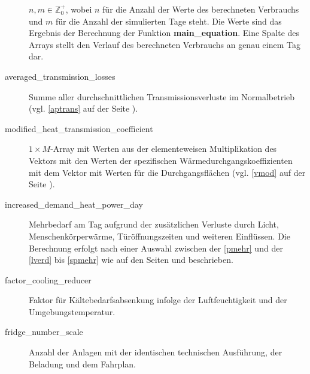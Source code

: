 \begin{description}
	$n,m\in \mathbb{Z}^+_0$, wobei $n$ f\"ur die Anzahl der Werte des
	berechneten Verbrauchs und $m$ f\"ur die Anzahl der simulierten Tage
	steht. Die Werte sind das Ergebnis der Berechnung der Funktion
	\textbf{main\_equation}. Eine Spalte des Arrays stellt den Verlauf des
	berechneten Verbrauchs an genau einem Tag dar.
	\item[averaged\_transmission\_losses] Summe aller durchschnittlichen
	Transmissionsverluste im Normalbetrieb (vgl. \cref{aptrans} auf der
	Seite \pageref{aptrans}).
	\item[modified\_heat\_transmission\_coefficient] $1\times M$-Array mit
	Werten aus der elementeweisen Multiplikation des Vektors mit den Werten
	der spezifischen W\"armedurchgangskoeffizienten mit dem Vektor mit
	Werten f\"ur die Durchgangsfl\"achen (vgl.  \cref{vmod} auf der Seite
	\pageref{vmod}).
	\item[increased\_demand\_heat\_power\_day] Mehrbedarf am Tag aufgrund
	der zus\"atzlichen Verluste durch Licht, Menschenk\"orperw\"arme,
	T\"ur\"offnungszeiten und weiteren Einfl\"ussen. Die Berechnung erfolgt
	nach einer Auswahl zwischen der \cref{pmehr} und der \cref{lverd} bis
	\cref{spmehr} wie auf den Seiten \pageref{pmehr} und \pageref{spmehr}
	beschrieben.
	\item[factor\_cooling\_reducer] Faktor f\"ur K\"altebedarfsabsenkung
	infolge der Luftfeuchtigkeit und der Umgebungstemperatur.
	\item[fridge\_number\_scale] Anzahl der Anlagen mit der identischen
	technischen Ausf\"uhrung, der Beladung und dem Fahrplan.
\end{description}

